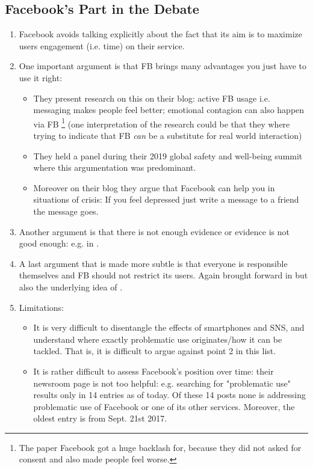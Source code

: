 \subsection{Facebook's Part in the Debate}
\begin{enumerate}
    \item Facebook avoids talking explicitly about the fact that its aim is to maximize users engagement (i.e. time) on their service.
    \item One important argument is that FB brings many advantages you just have to use it right:\begin{itemize}
        \item They present research on this on their blog: active FB usage i.e. messaging makes people feel better; emotional contagion can also happen via FB \citep{kramer_experimental_2014}\footnote{The paper Facebook got a huge backlash for, because they did not asked for consent and also made people feel worse.} (one interpretation of the research could be that they where trying to indicate that FB \textit{can} be a substitute for real world interaction)
        \item They held a panel during their 2019 global safety and well-being summit \citep{groman_so_2019} where this argumentation was predominant.
        \item Moreover on their blog they argue that Facebook can help you in situations of crisis: If you feel depressed just write a message to a friend \citep{facebook_connecting_2020, davis_connecting_2017, facebook_making_2021} the message goes.
    \end{itemize}
    \item Another argument is that there is not enough evidence or evidence is not good enough: e.g. in \citep{groman_so_2019}. 
    \item A last argument that is made more subtle is that everyone is responsible themselves and FB should not restrict its users. Again brought forward in \citep{groman_so_2019} but also the underlying idea of \citep{facebook_connecting_2020, davis_connecting_2017, facebook_making_2021}.
    \item Limitations: \begin{itemize}
        \item It is very difficult to disentangle the effects of smartphones and SNS, and understand where exactly problematic use originates/how it can be tackled. That is, it is difficult to argue against point 2 in this list.
        \item It is rather difficult to assess Facebook's position over time: their newsroom page is not too helpful: e.g. searching for "problematic use" results only in 14 entries as of today. Of these 14 posts none is addressing problematic use of Facebook or one of its other services. Moreover, the oldest entry is from Sept. 21st 2017.

\end{itemize}
\end{enumerate}
